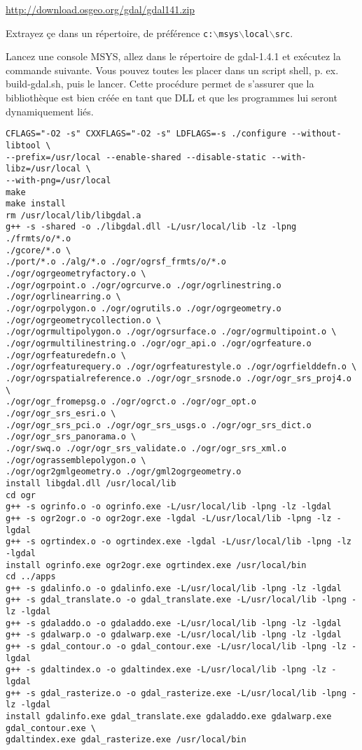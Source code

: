 \url{http://download.osgeo.org/gdal/gdal141.zip}

Extrayez çe dans un répertoire, de préférence \texttt{c:$\backslash$msys$\backslash$local$\backslash$src}.

Lancez une console MSYS, allez dans le répertoire de gdal-1.4.1 et exécutez la commande suivante. Vous pouvez toutes les placer dans un script shell, p. ex. build-gdal.sh, puis le lancer. Cette procédure permet de s'assurer que la bibliothèque est bien créée en tant que DLL et que les programmes lui seront dynamiquement liés.

\begin{verbatim}
CFLAGS="-O2 -s" CXXFLAGS="-O2 -s" LDFLAGS=-s ./configure --without-libtool \
--prefix=/usr/local --enable-shared --disable-static --with-libz=/usr/local \
--with-png=/usr/local
make
make install
rm /usr/local/lib/libgdal.a
g++ -s -shared -o ./libgdal.dll -L/usr/local/lib -lz -lpng ./frmts/o/*.o
./gcore/*.o \
./port/*.o ./alg/*.o ./ogr/ogrsf_frmts/o/*.o ./ogr/ogrgeometryfactory.o \
./ogr/ogrpoint.o ./ogr/ogrcurve.o ./ogr/ogrlinestring.o ./ogr/ogrlinearring.o \
./ogr/ogrpolygon.o ./ogr/ogrutils.o ./ogr/ogrgeometry.o
./ogr/ogrgeometrycollection.o \
./ogr/ogrmultipolygon.o ./ogr/ogrsurface.o ./ogr/ogrmultipoint.o \
./ogr/ogrmultilinestring.o ./ogr/ogr_api.o ./ogr/ogrfeature.o
./ogr/ogrfeaturedefn.o \ 
./ogr/ogrfeaturequery.o ./ogr/ogrfeaturestyle.o ./ogr/ogrfielddefn.o \
./ogr/ogrspatialreference.o ./ogr/ogr_srsnode.o ./ogr/ogr_srs_proj4.o \
./ogr/ogr_fromepsg.o ./ogr/ogrct.o ./ogr/ogr_opt.o ./ogr/ogr_srs_esri.o \
./ogr/ogr_srs_pci.o ./ogr/ogr_srs_usgs.o ./ogr/ogr_srs_dict.o
./ogr/ogr_srs_panorama.o \
./ogr/swq.o ./ogr/ogr_srs_validate.o ./ogr/ogr_srs_xml.o
./ogr/ograssemblepolygon.o \
./ogr/ogr2gmlgeometry.o ./ogr/gml2ogrgeometry.o
install libgdal.dll /usr/local/lib
cd ogr
g++ -s ogrinfo.o -o ogrinfo.exe -L/usr/local/lib -lpng -lz -lgdal
g++ -s ogr2ogr.o -o ogr2ogr.exe -lgdal -L/usr/local/lib -lpng -lz -lgdal
g++ -s ogrtindex.o -o ogrtindex.exe -lgdal -L/usr/local/lib -lpng -lz -lgdal
install ogrinfo.exe ogr2ogr.exe ogrtindex.exe /usr/local/bin
cd ../apps
g++ -s gdalinfo.o -o gdalinfo.exe -L/usr/local/lib -lpng -lz -lgdal
g++ -s gdal_translate.o -o gdal_translate.exe -L/usr/local/lib -lpng -lz -lgdal
g++ -s gdaladdo.o -o gdaladdo.exe -L/usr/local/lib -lpng -lz -lgdal
g++ -s gdalwarp.o -o gdalwarp.exe -L/usr/local/lib -lpng -lz -lgdal
g++ -s gdal_contour.o -o gdal_contour.exe -L/usr/local/lib -lpng -lz -lgdal
g++ -s gdaltindex.o -o gdaltindex.exe -L/usr/local/lib -lpng -lz -lgdal
g++ -s gdal_rasterize.o -o gdal_rasterize.exe -L/usr/local/lib -lpng -lz -lgdal
install gdalinfo.exe gdal_translate.exe gdaladdo.exe gdalwarp.exe
gdal_contour.exe \
gdaltindex.exe gdal_rasterize.exe /usr/local/bin

\end{verbatim}

